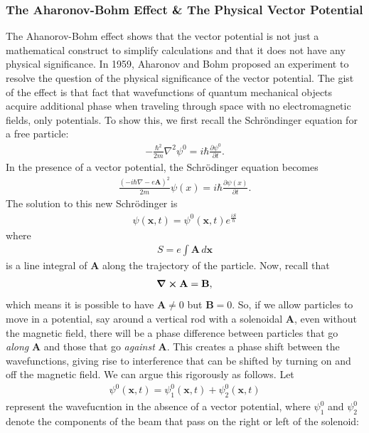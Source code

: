 \documentclass[a4paper,11pt]{article}
\numberwithin{equation}{section}
\theoremstyle{definition}
\newcommand{\p}{\partial}
\begin{document}
\subsubsection{The Aharonov-Bohm Effect \& The Physical Vector Potential}
The Ahanorov-Bohm effect shows that the vector potential is not just a mathematical construct to simplify calculations and that it does not have any physical significance. In 1959, Aharonov and Bohm proposed an experiment to resolve the question of the physical significance of the vector potential. The gist of the effect is that fact that wavefunctions of quantum mechanical objects acquire additional phase when traveling through space with no electromagnetic fields, only potentials. To show this, we first recall the Schr\"ondinger equation for a free particle:
\begin{align*}
-\frac{\hbar^2}{2m}\nabla^2 \psi^0 = i\hbar \frac{\p \psi^0}{\p t}.
\end{align*}
In the presence of a vector potential, the Schr\"odinger equation becomes
\begin{align*}
\frac{(-i\hbar\nabla - e\mathbf{A})^2}{2m} \psi(x) = i\hbar \frac{\p \psi(x)}{\p t}.
\end{align*}
The solution to this new Schr\"odinger is
\begin{align*}
\psi(\mathbf{x},t) = \psi^0(\mathbf{x},t)e^{\frac{iS}{\hbar}}
\end{align*}
where
\begin{align*}
S = e\int \mathbf{A}\,d\mathbf{x}
\end{align*}
is a line integral of $\mathbf{A}$ along the trajectory of the particle. Now, recall that
\begin{align*}
\curl{\mathbf{A}} = \mathbf{B},
\end{align*}
which means it is possible to have $\mathbf{A} \neq 0$ but $\mathbf{B} = 0$. So, if we allow particles to move in a potential, say around a vertical rod with a solenoidal $\mathbf{A}$, even without the magnetic field, there will be a phase difference between particles that go \textit{along} $\mathbf{A}$ and those that go \textit{against} $\mathbf{A}$. This creates a phase shift between the wavefunctions, giving rise to interference that can be shifted by turning on and off the magnetic field. We can argue this rigorously as follows. Let
\begin{align*}
\psi^0(\mathbf{x},t) = \psi_1^0(\mathbf{x},t) + \psi_2^0(\mathbf{x},t)
\end{align*}
represent the wavefucntion in the absence of a vector potential, where $\psi^0_1$ and $\psi^0_2$ denote the components of the beam that pass on the right or left of the solenoid:
\end{document}
